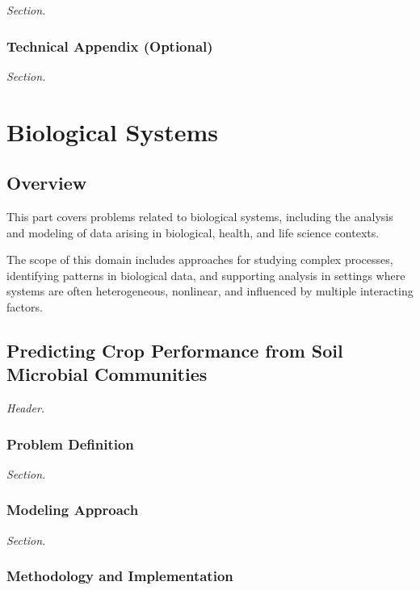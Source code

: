 \documentclass[
  12pt,
  letterpaper,
]{book}
\begin{document}
\emph{Section.}

\section{Technical Appendix
(Optional)}\label{technical-appendix-optional-4}

\emph{Section.}

\part{Biological Systems}

\chapter*{Overview}\label{overview-2}


This part covers problems related to biological systems, including the
analysis and modeling of data arising in biological, health, and life
science contexts.

The scope of this domain includes approaches for studying complex
processes, identifying patterns in biological data, and supporting
analysis in settings where systems are often heterogeneous, nonlinear,
and influenced by multiple interacting factors.

\chapter{Predicting Crop Performance from Soil Microbial
Communities}\label{predicting-crop-performance-from-soil-microbial-communities}

\emph{Header.}

\section{Problem Definition}\label{problem-definition-6}

\emph{Section.}

\section{Modeling Approach}\label{modeling-approach-6}

\emph{Section.}

\section{Methodology and
Implementation}\label{methodology-and-implementation-6}
\end{document}
